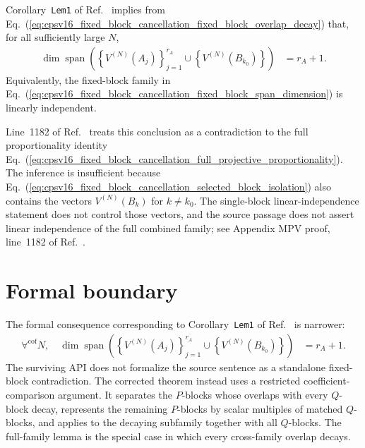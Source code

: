 \documentclass{article}
\begin{document}
Corollary~\texttt{Lem1} of Ref.~\cite{Cirac2016MPDO_arXiv} implies from
Eq.~(\ref{eq:cpsv16_fixed_block_cancellation_fixed_block_overlap_decay}) that,
for all sufficiently large $N$,
\begin{align}
    \dim\operatorname{span}
        \left(\left\{V^{(N)}(A_j)\right\}_{j=1}^{r_A}
            \cup
            \left\{V^{(N)}(B_{k_0})\right\}\right)
        &= r_A+1.
    \label{eq:cpsv16_fixed_block_cancellation_fixed_block_span_dimension}
\end{align}
Equivalently, the fixed-block family in
Eq.~(\ref{eq:cpsv16_fixed_block_cancellation_fixed_block_span_dimension}) is
linearly independent.

Line~1182 of Ref.~\cite{Cirac2016MPDO_arXiv} treats this conclusion as a
contradiction to the full proportionality identity
Eq.~(\ref{eq:cpsv16_fixed_block_cancellation_full_projective_proportionality}).
The inference is insufficient because
Eq.~(\ref{eq:cpsv16_fixed_block_cancellation_selected_block_isolation}) also
contains the vectors $V^{(N)}(B_k)$ for $k\neq k_0$. The single-block
linear-independence statement does not control those vectors, and the source
passage does not assert linear independence of the full combined family; see
Appendix MPV proof, line~1182 of Ref.~\cite{Cirac2016MPDO_arXiv}.

\section{Formal boundary}

The formal consequence corresponding to Corollary~\texttt{Lem1} of
Ref.~\cite{Cirac2016MPDO_arXiv} is narrower:
\begin{align}
    \forall^\mathrm{cof}N,\quad
    \dim\operatorname{span}
        \left(\left\{V^{(N)}(A_j)\right\}_{j=1}^{r_A}
            \cup
            \left\{V^{(N)}(B_{k_0})\right\}\right)
        &= r_A+1.
    \label{eq:cpsv16_fixed_block_cancellation_formal_fixed_block_boundary}
\end{align}
The surviving  API does not formalize the source sentence as
a standalone fixed-block contradiction. The corrected theorem instead uses a
restricted coefficient-comparison argument. It separates the $P$-blocks whose
overlaps with every $Q$-block decay, represents the remaining $P$-blocks by
scalar multiples of matched $Q$-blocks, and applies
 to the decaying
subfamily together with all $Q$-blocks. The full-family lemma
 is the
special case in which every cross-family overlap decays.
\end{document}
